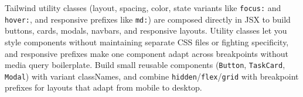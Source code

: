 \whatwhyhow
{Tailwind utility classes (layout, spacing, color, state variants like \texttt{focus:} and \texttt{hover:}, and responsive prefixes like \texttt{md:}) are composed directly in JSX to build buttons, cards, modals, navbars, and responsive layouts.}
{Utility classes let you style components without maintaining separate CSS files or fighting specificity, and responsive prefixes make one component adapt across breakpoints without media query boilerplate.}
{Build small reusable components (\texttt{Button}, \texttt{TaskCard}, \texttt{Modal}) with variant classNames, and combine \texttt{hidden}/\texttt{flex}/\texttt{grid} with breakpoint prefixes for layouts that adapt from mobile to desktop.}
